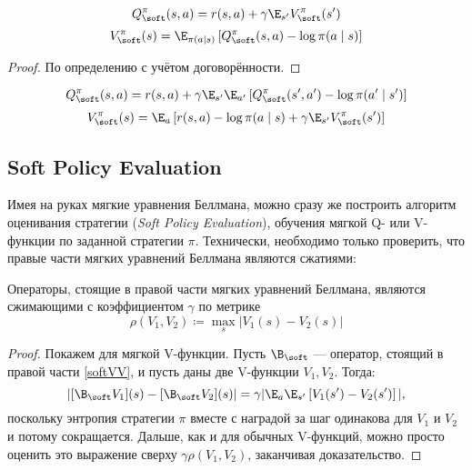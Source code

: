 \begin{theorem}
\begin{equation}\label{softQV}
Q^\pi_{\soft}(s, a) = r(s, a) + \gamma \E_{s'} V^\pi_{\soft}(s')
\end{equation}
\begin{equation}\label{softVQ}
V^\pi_{\soft}(s) = \E_{\pi(a \mid s)} \left[ Q^\pi_{\soft}(s, a) - \log \pi(a \mid s) \right]
\end{equation}
\begin{proof}
По определению с учётом договорённости.
\end{proof}
\end{theorem}

\begin{theorem}
\begin{equation}\label{softQQ}
Q^\pi_{\soft}(s, a) = r(s, a) + \gamma \E_{s'} \E_{a'} \left[ Q^\pi_{\soft}(s', a') - \log \pi(a' \mid s') \right]
\end{equation}
\begin{equation}\label{softVV}
V^\pi_{\soft}(s) = \E_{a} \left[ r(s, a) - \log \pi(a \mid s) + \gamma \E_{s'} V^\pi_{\soft}(s') \right]
\end{equation}
\end{theorem}

\subsection{Soft Policy Evaluation}

Имея на руках мягкие уравнения Беллмана, можно сразу же построить алгоритм оценивания стратегии (\emph{Soft Policy Evaluation}), обучения мягкой Q- или V-функции по заданной стратегии $\pi$. Технически, необходимо только проверить, что правые части мягких уравнений Беллмана являются сжатиями:

\begin{theorem}
Операторы, стоящие в правой части мягких уравнений Беллмана, являются сжимающими с коэффициентом $\gamma$ по метрике
$$\rho(V_1, V_2) \coloneqq \max\limits_{s} | V_1(s) - V_2(s) |$$
\begin{proof}
Покажем для мягкой V-функции. Пусть $\B_{\soft}$ --- оператор, стоящий в правой части \eqref{softVV}, и пусть даны две V-функции $V_1, V_2$.
Тогда:
$$
| [\B_{\soft} V_1](s) - [\B_{\soft} V_2](s) | = \gamma | \E_{a} \E_{s'} \left[ V_1(s') - V_2(s') \right] |,
$$
поскольку энтропия стратегии $\pi$ вместе с наградой за шаг одинакова для $V_1$ и $V_2$ и потому сокращается. Дальше, как и для обычных V-функций, можно просто оценить это выражение сверху $\gamma \rho(V_1, V_2)$, заканчивая доказательство.
\end{proof}
\end{theorem}

